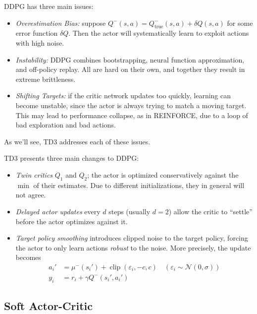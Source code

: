 \documentclass[11pt, letterpaper]{article}
\begin{document}
\begin{remark}
    DDPG has three main issues:
    \begin{itemize}
        \item \textit{Overestimation Bias:} suppose \(Q^-(s,a) = Q_{\text{true}}^-(s,a) + \delta Q(s,a)\) for some error function \(\delta Q\). Then the actor will systematically learn to exploit actions with high noise. 
        \item \textit{Instability:} DDPG combines bootstrapping, neural function approximation, and off-policy replay. All are hard on their own, and together they result in extreme brittleness. 
        \item \textit{Shifting Targets:} if the critic network updates too quickly, learning can become unstable, since the actor is always trying to match a moving target. This may lead to performance collapse, as in REINFORCE, due to a loop of bad exploration and bad actions. 
    \end{itemize}
    As we'll see, TD3 addresses each of these issues. 
\end{remark}

\begin{concept}
    TD3 presents three main changes to DDPG: 
    \begin{itemize}
        \item \textit{Twin critics} \(Q_1\) and \(Q_2\); the actor is optimized conservatively against the \(\min\) of their estimates. Due to different initializations, they in general will not agree. 
        \item \textit{Delayed actor updates} every \(d\) steps (usually \(d=2\)) allow the critic to ``settle'' before the actor optimizes against it. 
        \item \textit{Target policy smoothing} introduces clipped noise to the target policy, forcing the actor to only learn actions \textit{robust} to the noise. More precisely, the update becomes
            \begin{align*}
                a_i' &= \mu^-(s_i') + \operatorname{clip}(\varepsilon_i, -c, c) \quad (\varepsilon_i \sim \mathcal{N}(0, \sigma)) \\
                y_i &= r_i + \gamma Q^-(s_i', a_i') 
            \end{align*}
    \end{itemize}
\end{concept}

\subsection{Soft Actor-Critic}
\end{document}
